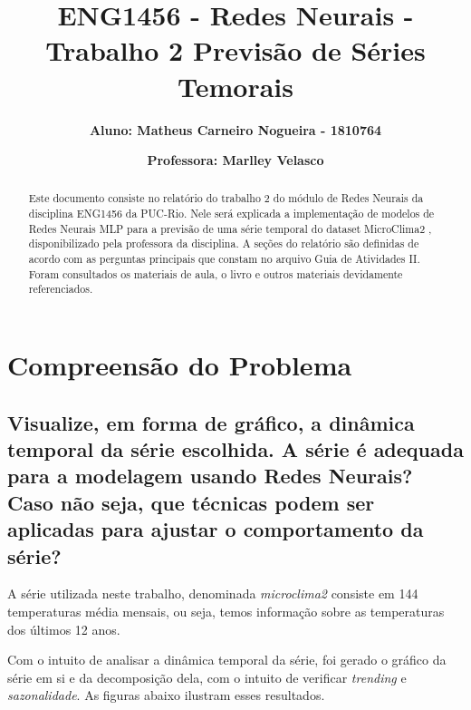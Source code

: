 \documentclass[12pt]{article}
\title{\textbf{ENG1456 - Redes Neurais - Trabalho 2 Previsão de Séries Temorais}}
\author{\textbf{Aluno: Matheus Carneiro Nogueira - 1810764}}
\affil{}
\author{\textbf{Professora: Marlley Velasco}}
\affil{}
\date{}
\begin{document}
	\maketitle
	\tableofcontents
	
	
	\begin{abstract}
		Este documento consiste no relatório do trabalho 2 do módulo de Redes Neurais da disciplina ENG1456 da PUC-Rio. Nele será explicada a implementação de modelos de Redes Neurais MLP para a previsão de uma série temporal do dataset MicroClima2 , disponibilizado pela professora da disciplina. A seções do relatório são definidas de acordo com as perguntas principais que constam no arquivo Guia de Atividades II. Foram consultados os materiais de aula, o livro \cite{livro} e outros materiais devidamente referenciados.
	\end{abstract}
		
	\section{Compreensão do Problema}
	\subsection{Visualize, em forma de gráfico, a dinâmica temporal da série escolhida. A série é adequada para a modelagem usando Redes Neurais? Caso não seja, que técnicas podem ser aplicadas para ajustar o comportamento da série?}\label{subsec:1.1}
	
	A série utilizada neste trabalho, denominada \textit{microclima2} consiste em 144 temperaturas média mensais, ou seja, temos informação sobre as temperaturas dos últimos 12 anos.
	
	Com o intuito de analisar a dinâmica temporal da série, foi gerado o gráfico da série em si e da decomposição dela, com o intuito de verificar \textit{trending} e \textit{sazonalidade}. As figuras abaixo ilustram esses resultados.
	
\end{document}
